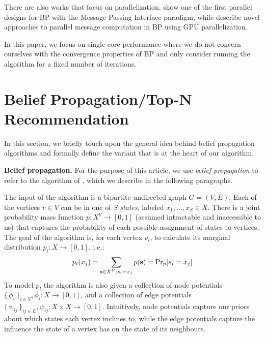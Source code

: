 \documentclass[letterpaper]{article}
\newcommand{\mypar}[1]{{\bf #1.}}
\begin{document}
There are also works that focus on parallelization. \citet{related2} show one of the first parallel designs for BP with the Message Passing Interface paradigm, while \citet{related3} describe novel approaches to parallel message computation in BP using GPU parallelization.

In this paper, we focus on single core performance where we do not concern ourselves with the convergence properties of BP and only consider running the algorithm for a fixed number of iterations.


\section{Belief Propagation/Top-N Recommendation}\label{sec:background}

In this section, we briefly touch upon the general idea behind belief
propagation algorithms and formally define the variant that is at the heart of
our algorithm.


\mypar{Belief propagation} For the purpose of this article, we use \emph{belief
propagation} to refer to the algorithm of \citet[Section
2.1]{top-n-recommendation}, which we describe in the following paragraphs.

The input of the algorithm is a bipartite undirected graph $G = (V, E)$. Each of the vertices $v\in V$ can
be in one of $S$ \emph{states}, labeled $x_1, \ldots, x_S \in X$. There is a
joint probability mass function $p: X^V \to [0, 1]$ (assumed intractable and
inaccessible to us) that captures the probability of each possible assignment of
states to vertices. The goal of the algorithm is, for each vertex $v_i$, to
calculate its marginal distribution $p_i: X \to [0, 1]$, i.e.:
%
$$p_i(x_j) = \sum_{\ves \in X^V: s_i = x_j} p(\ves) = \Pr_p[s_i = x_j]$$
%
To model $p$, the algorithm is also given a collection of node potentials
$\{\,\phi_i\,\}_{i \in V}, \phi_i: X \to [0, 1]$, and a collection of edge
potentials $\{\,\psi_{ij}\,\}_{ij \in E}, \psi_{ij}: X\times X \to [0, 1]$.
Intuitively, node potentials capture our priors about which states each vertex
inclines to, while the edge potentials capture the influence the state of a
vertex has on the state of its neighbours.
\end{document}
